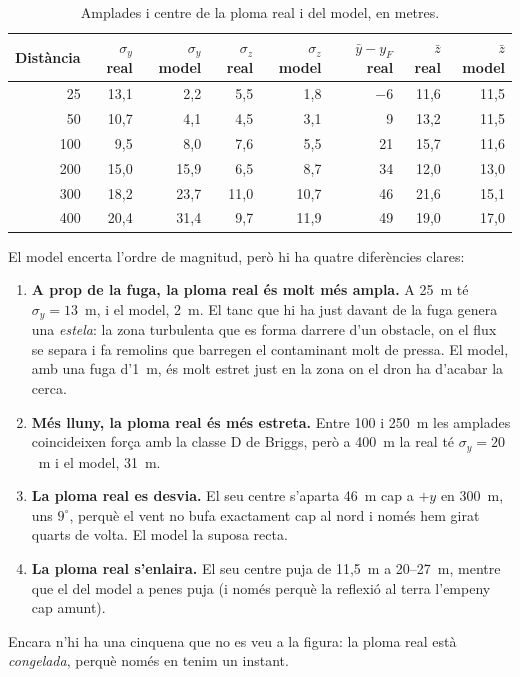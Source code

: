 \documentclass[11pt,a4paper]{article}
\begin{document}
\begin{table}[htbp]
\centering
\caption{Amplades i centre de la ploma real i del model, en metres.}
\label{tab:moments}
\begin{tabular}{@{}rrrrrrrr@{}}
\toprule
Distància & $\sigma_y$ real & $\sigma_y$ model & $\sigma_z$ real & $\sigma_z$ model & $\bar y - y_F$ real & $\bar z$ real & $\bar z$ model \\
\midrule
25 & 13,1 & 2,2 & 5,5 & 1,8 & $-6$ & 11,6 & 11,5 \\
50 & 10,7 & 4,1 & 4,5 & 3,1 & 9 & 13,2 & 11,5 \\
100 & 9,5 & 8,0 & 7,6 & 5,5 & 21 & 15,7 & 11,6 \\
200 & 15,0 & 15,9 & 6,5 & 8,7 & 34 & 12,0 & 13,0 \\
300 & 18,2 & 23,7 & 11,0 & 10,7 & 46 & 21,6 & 15,1 \\
400 & 20,4 & 31,4 & 9,7 & 11,9 & 49 & 19,0 & 17,0 \\
\bottomrule
\end{tabular}
\end{table}

El model encerta l'ordre de magnitud, però hi ha quatre diferències clares:
\begin{enumerate}
\item \textbf{A prop de la fuga, la ploma real és molt més ampla.} A 25~m té $\sigma_y = 13$~m, i el model, 2~m. El tanc que hi ha just davant de la fuga genera una \emph{estela}: la zona turbulenta que es forma darrere d'un obstacle, on el flux se separa i fa remolins que barregen el contaminant molt de pressa. El model, amb una fuga d'1~m, és molt estret just en la zona on el dron ha d'acabar la cerca.
\item \textbf{Més lluny, la ploma real és més estreta.} Entre 100 i 250~m les amplades coincideixen força amb la classe D de Briggs, però a 400~m la real té $\sigma_y = 20$~m i el model, 31~m.
\item \textbf{La ploma real es desvia.} El seu centre s'aparta 46~m cap a $+y$ en 300~m, uns $9^\circ$, perquè el vent no bufa exactament cap al nord i només hem girat quarts de volta. El model la suposa recta.
\item \textbf{La ploma real s'enlaira.} El seu centre puja de 11,5~m a 20--27~m, mentre que el del model a penes puja (i només perquè la reflexió al terra l'empeny cap amunt).
\end{enumerate}
Encara n'hi ha una cinquena que no es veu a la figura: la ploma real està \emph{congelada}, perquè només en tenim un instant.
\end{document}
